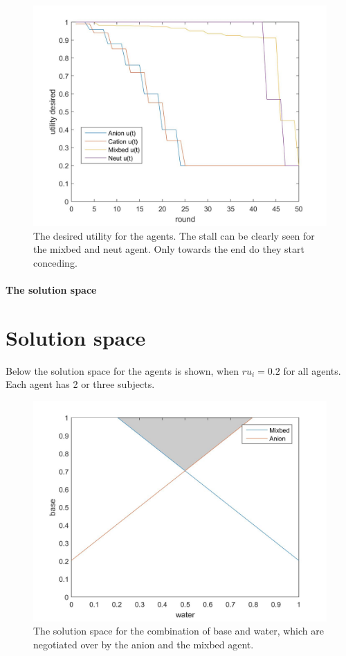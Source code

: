 \begin{figure}[h]
	\centering
	\includegraphics[width=0.7\linewidth]{img/desiredutility_reactive_4}
	\caption{The desired utility for the agents. The stall can be clearly seen for the mixbed and neut agent. Only towards the end do they start conceding.}
	\label{fig:desiredutilityreactive4}
\end{figure}

\paragraph{The solution space}

\section{Solution space}
Below the solution space for the agents is shown, when $ru_i = 0.2$ for all agents. Each agent has 2 or three subjects. 
\begin{figure}[h]
	\centering
	\includegraphics[width=0.7\linewidth]{img/reservationcurve_water_base}
	\caption{The solution space for the combination of base and water, which are negotiated over by the anion and the mixbed agent.}
	\label{fig:reservationcurvewaterbase}
\end{figure}

